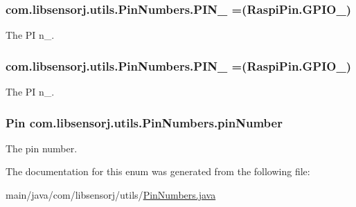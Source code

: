 \subsubsection[{P\+I\+N\+\_\+28}]{\setlength{\rightskip}{0pt plus 5cm}com.\+libsensorj.\+utils.\+Pin\+Numbers.\+P\+I\+N\+\_ =(Raspi\+Pin.\+G\+P\+I\+O\+\_)}\label{enumcom_1_1libsensorj_1_1utils_1_1PinNumbers_af7bec7611fed7e9b64e25485f2378f81}
The P\+I n\+\_. \hypertarget{enumcom_1_1libsensorj_1_1utils_1_1PinNumbers_a78cc24e6c72e7dceb4a9a152cc9da41f}{}
\subsubsection[{P\+I\+N\+\_\+29}]{\setlength{\rightskip}{0pt plus 5cm}com.\+libsensorj.\+utils.\+Pin\+Numbers.\+P\+I\+N\+\_ =(Raspi\+Pin.\+G\+P\+I\+O\+\_)}\label{enumcom_1_1libsensorj_1_1utils_1_1PinNumbers_a78cc24e6c72e7dceb4a9a152cc9da41f}
The P\+I n\+\_. \hypertarget{enumcom_1_1libsensorj_1_1utils_1_1PinNumbers_a82cad4bc9bde38b8b6e9f33f5ce8bf3d}{}
\subsubsection[{pin\+Number}]{\setlength{\rightskip}{0pt plus 5cm}Pin com.\+libsensorj.\+utils.\+Pin\+Numbers.\+pin\+Number}\label{enumcom_1_1libsensorj_1_1utils_1_1PinNumbers_a82cad4bc9bde38b8b6e9f33f5ce8bf3d}
The pin number. 

The documentation for this enum was generated from the following file\+:\begin{DoxyCompactItemize}
\item 
main/java/com/libsensorj/utils/\hyperlink{PinNumbers_8java}{Pin\+Numbers.\+java}\end{DoxyCompactItemize}
